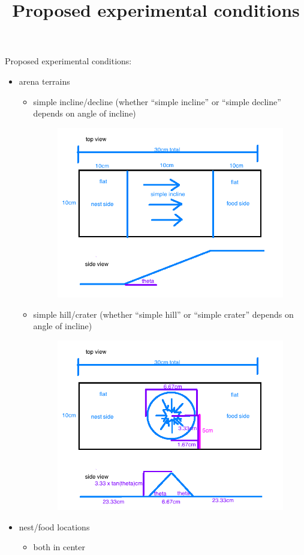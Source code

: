 \documentclass{article}
\title{Proposed experimental conditions}
\begin{document}
Proposed experimental conditions:
\begin{itemize}
	\item arena terrains
	\begin{itemize}
    	\item simple incline/decline (whether ``simple incline'' or ``simple decline'' depends on angle of incline)
        \begin{figure}[H]
        \includegraphics[width=10cm]{simple_incline_schematic}
        \end{figure}
        \item simple hill/crater (whether ``simple
        hill'' or ``simple crater'' depends on angle of incline)
        \begin{figure}[H]
         \includegraphics[width=10cm]{simple_hill_schematic}
         \end{figure}
    \end{itemize}
    \item nest/food locations
    \begin{itemize}
    	\item both in center
         \begin{figure}[H]

\end{figure}
\end{itemize}
\end{itemize}
\end{document}
